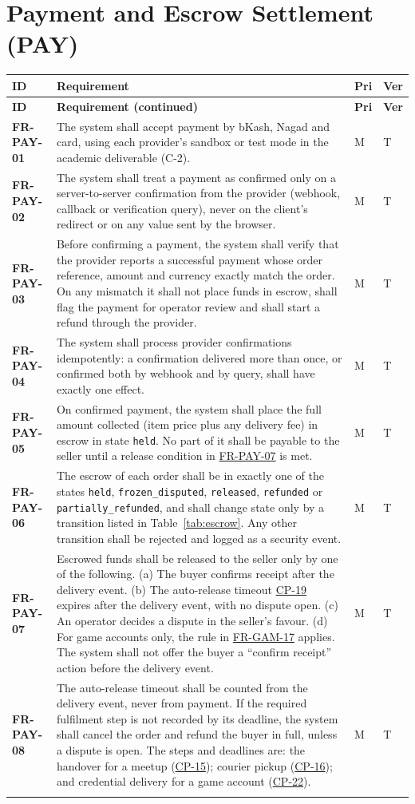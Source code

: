\documentclass[11pt,a4paper]{report}
\makeatletter
\newenvironment{reqs}{%
  \small
  \begin{longtable}{@{}>{\raggedright\arraybackslash}p{2.35cm}
                       >{\raggedright\arraybackslash}p{10.3cm}
                       >{\centering\arraybackslash}p{0.7cm}
                       >{\centering\arraybackslash}p{0.7cm}@{}}
  \toprule
  \textbf{ID} & \textbf{Requirement} & \textbf{Pri} & \textbf{Ver} \\
  \midrule
  \endfirsthead
  \toprule
  \textbf{ID} & \textbf{Requirement (continued)} & \textbf{Pri} & \textbf{Ver} \\
  \midrule
  \endhead
  \bottomrule
  \endfoot
}{\end{longtable}}
\newcommand{\req}[5]{\leavevmode\textbf{#1}\hypertarget{#1}{} & #5 & #2 & #3 \\ \addlinespace[2pt]}
\newcommand{\rr}[1]{\hyperlink{#1}{#1}}
\newcommand{\cp}[1]{\hyperlink{#1}{#1}}
\makeatother
\begin{document}
\section{Payment and Escrow Settlement (PAY)}
\label{sec:fr-pay}
\begin{reqs}
\req{FR-PAY-01}{M}{T}{FR-39}{The system shall accept payment by bKash, Nagad and card, using each provider's sandbox or test mode in the academic deliverable (C-2).}
\req{FR-PAY-02}{M}{T}{FR-40}{The system shall treat a payment as confirmed only on a server-to-server confirmation from the provider (webhook, callback or verification query), never on the client's redirect or on any value sent by the browser.}
\req{FR-PAY-03}{M}{T}{new}{Before confirming a payment, the system shall verify that the provider reports a successful payment whose order reference, amount and currency exactly match the order. On any mismatch it shall not place funds in escrow, shall flag the payment for operator review and shall start a refund through the provider.}
\req{FR-PAY-04}{M}{T}{FR-41}{The system shall process provider confirmations idempotently: a confirmation delivered more than once, or confirmed both by webhook and by query, shall have exactly one effect.}
\req{FR-PAY-05}{M}{T}{FR-42}{On confirmed payment, the system shall place the full amount collected (item price plus any delivery fee) in escrow in state \texttt{held}. No part of it shall be payable to the seller until a release condition in \rr{FR-PAY-07} is met.}
\req{FR-PAY-06}{M}{T}{FR-44}{The escrow of each order shall be in exactly one of the states \texttt{held}, \texttt{frozen\_disputed}, \texttt{released}, \texttt{refunded} or \texttt{partially\_refunded}, and shall change state only by a transition listed in Table~\ref{tab:escrow}. Any other transition shall be rejected and logged as a security event.}
\req{FR-PAY-07}{M}{T}{FR-43}{Escrowed funds shall be released to the seller only by one of the following. (a) The buyer confirms receipt after the delivery event. (b) The auto-release timeout \cp{CP-19} expires after the delivery event, with no dispute open. (c) An operator decides a dispute in the seller's favour. (d) For game accounts only, the rule in \rr{FR-GAM-17} applies. The system shall not offer the buyer a ``confirm receipt'' action before the delivery event.}
\req{FR-PAY-08}{M}{T}{new}{The auto-release timeout shall be counted from the delivery event, never from payment. If the required fulfilment step is not recorded by its deadline, the system shall cancel the order and refund the buyer in full, unless a dispute is open. The steps and deadlines are: the handover for a meetup (\cp{CP-15}); courier pickup (\cp{CP-16}); and credential delivery for a game account (\cp{CP-22}).}

\end{reqs}
\end{document}
